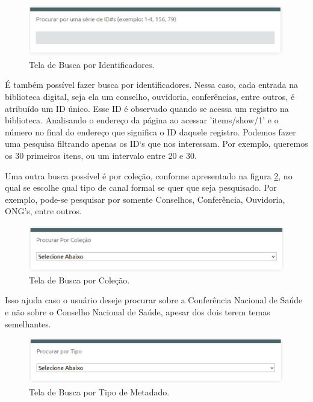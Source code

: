 \graphicspath{{figuras/prototipo/}}
\begin{figure}[H]
\centering
\includegraphics[width=1.0\textwidth]{busca-identificadores}
\caption{Tela de Busca por Identificadores.}
\label{fig:buscaidentificadores_prototipo}
\end{figure}

É também possível fazer busca por identificadores. Nessa caso, cada entrada na biblioteca digital, seja ela um conselho, ouvidoria, conferências, entre outros, é atribuído um ID único. Esse ID é observado quando se acessa um registro na biblioteca. Analisando o endereço da página ao acessar 'items/show/1' e o número no final do endereço que significa o ID daquele registro. Podemos fazer uma pesquisa filtrando apenas os ID`s que nos interessam. Por exemplo, queremos os 30 primeiros itens, ou um intervalo entre 20 e 30.

Uma outra busca possível é por coleção, conforme apresentado na figura \ref{fig:buscacolecao_prototipo}, no qual se escolhe qual tipo de canal formal se quer que seja pesquisado. Por exemplo, pode-se pesquisar por somente Conselhos, Conferência, Ouvidoria, ONG’s, entre outros.

\graphicspath{{figuras/prototipo/}}
\begin{figure}[H]
\centering
\includegraphics[width=1.0\textwidth]{busca-colecao}
\caption{Tela de Busca por Coleção.}
\label{fig:buscacolecao_prototipo}
\end{figure}

Isso ajuda caso o usuário deseje procurar sobre a Conferência Nacional de Saúde e não sobre o Conselho Nacional de Saúde, apesar dos dois terem temas semelhantes.

\graphicspath{{figuras/prototipo/}}
\begin{figure}[H]
\centering
\includegraphics[width=1.0\textwidth]{busca-tipo-metadado}
\caption{Tela de Busca por Tipo de Metadado.}
\label{fig:buscatipometadado_prototipo}
\end{figure}

